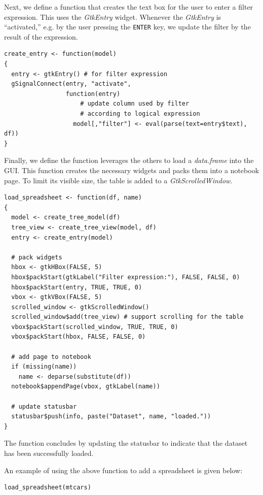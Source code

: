 \documentclass[article]{jss}
\begin{document}
Next, we define a function that creates the text box for the user to
enter a filter expression. This uses the \emph{GtkEntry} widget.
Whenever the \emph{GtkEntry} is ``activated,'' e.g. by the user
pressing the \texttt{ENTER} key, we update the filter by the result of
the  expression.
\begin{verbatim}
create_entry <- function(model)
{
  entry <- gtkEntry() # for filter expression
  gSignalConnect(entry, "activate", 
                 function(entry)
                     # update column used by filter 
                     # according to logical expression
                   model[,"filter"] <- eval(parse(text=entry$text),
df))
}
\end{verbatim}
Finally, we define the function leverages the others to load a \emph{data.frame} into the GUI. This function creates the necessary widgets and packs them into a notebook page. To limit its visible size, the table is added to a \emph{GtkScrolledWindow}.
\begin{verbatim}
load_spreadsheet <- function(df, name)
{
  model <- create_tree_model(df)
  tree_view <- create_tree_view(model, df)
  entry <- create_entry(model)

  # pack widgets
  hbox <- gtkHBox(FALSE, 5)
  hbox$packStart(gtkLabel("Filter expression:"), FALSE, FALSE, 0)
  hbox$packStart(entry, TRUE, TRUE, 0)
  vbox <- gtkVBox(FALSE, 5)
  scrolled_window <- gtkScrolledWindow()
  scrolled_window$add(tree_view) # support scrolling for the table
  vbox$packStart(scrolled_window, TRUE, TRUE, 0)
  vbox$packStart(hbox, FALSE, FALSE, 0)

  # add page to notebook  
  if (missing(name))
    name <- deparse(substitute(df))
  notebook$appendPage(vbox, gtkLabel(name))

  # update statusbar
  statusbar$push(info, paste("Dataset", name, "loaded."))
}
\end{verbatim}
The function concludes by updating the statusbar to indicate that the dataset has been successfully loaded.

An example of using the above function to add a spreadsheet is given
below:
\begin{verbatim}
load_spreadsheet(mtcars)
\end{verbatim}
\end{document}
